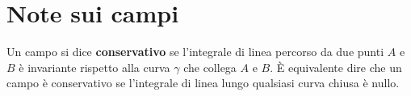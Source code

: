 \documentclass{book}
\begin{document}
    \section*{Note sui campi}
        Un campo si dice \textbf{conservativo} se l'integrale di linea percorso da due punti $A$ e $B$
        è invariante rispetto alla curva $\gamma$ che collega $A$ e $B$. È equivalente dire che un campo è conservativo
        se l'integrale di linea lungo qualsiasi curva chiusa è nullo. 
\end{document}
